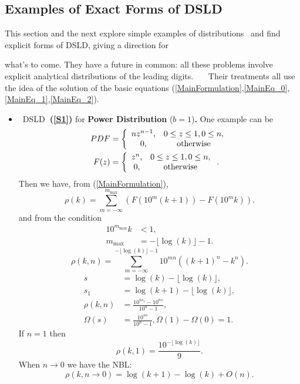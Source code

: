 \documentclass[titlepage,fleqn]{article}%
\begin{document}
\subsection{Examples of Exact Forms of DSLD}%

\label{TofD}%


This section and the next explore simple examples of distributions \ and find
explicit forms of DSLD, giving a direction for

what's to come. They have a future in common: all these problems involve
explicit analytical distributions of the leading digits. \newline\ \ \ Their
treatments all use the idea of the solution of the basic equations
(\ref{MainFormulation},\ref{MainEq_0},\ref{MainEq_1},\ref{MainEq_2}).

\begin{itemize}
\item \ DSLD\textbf{\ (\ref{S1})} for \textbf{Power Distribution}
($b=1$)\textbf{. }One example can be
\begin{align*}
PDF  &  =\left\{
\begin{array}
[c]{cc}%
nz^{n-1}, & 0\leq z\leq1,0\leq n,\\
0, & \text{otherwise}%
\end{array}
\right. \\
F(z)  &  =\left\{
\begin{array}
[c]{cc}%
z^{n}, & 0\leq z\leq1,0\leq n,\\
0, & \text{otherwise}%
\end{array}
\right.  .
\end{align*}
Then we have, from (\ref{MainFormulation}),%
\[
\rho(k)=%
{\displaystyle\sum\limits_{m=-\infty}^{m_{\max}}}
\left(  F(10^{m}(k+1))-F(10^{m}k)\right)  .
\]
and from the condition%
\begin{align*}
10^{m_{\max}}k  &  <1,\\
m_{\max}  &  =-\lfloor\log(k)\rfloor-1.
\end{align*}%
\[
\rho(k,n)=%
{\displaystyle\sum\limits_{m=-\infty}^{-\lfloor\log(k)\rfloor-1}}
10^{mn}\left(  (k+1)^{n}-k^{n}\right)  .
\]%
\begin{align}
s  &  =\log(k)-\lfloor\log(k)\rfloor,\label{Model1}\\
s_{1}  &  =\log(k+1)-\lfloor\log(k)\rfloor,\nonumber\\
\rho(k,n)  &  =\frac{10^{ns_{1}}-10^{ns}}{10^{n}-1},\nonumber\\
\Omega(s)  &  =\frac{10^{ns}}{10^{n}-1},\Omega(1)-\Omega(0)=1.\nonumber
\end{align}
If $n=1$ then
\[
\rho(k,1)=\frac{10^{-\lfloor\log(k)\rfloor}}{9}.
\]
When $n\rightarrow0$ we have the NBL:%
\[
\rho(k,n\rightarrow0)=\log(k+1)-\log(k)+O(n).
\]

\end{itemize}
\end{document}
